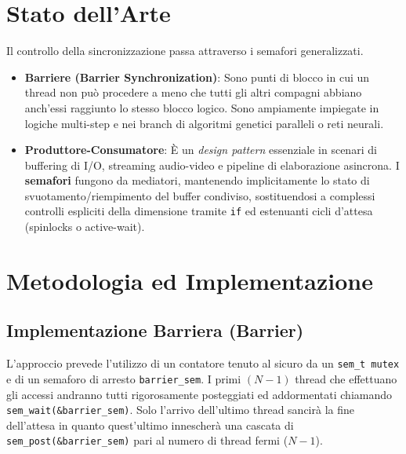 \documentclass[a4paper,12pt]{article}
\begin{document}
\section{Stato dell'Arte}
Il controllo della sincronizzazione passa attraverso i semafori generalizzati.
\begin{itemize}
    \item \textbf{Barriere (Barrier Synchronization)}: Sono punti di blocco in cui un thread non può procedere a meno che tutti gli altri compagni abbiano anch'essi raggiunto lo stesso blocco logico. Sono ampiamente impiegate in logiche multi-step e nei branch di algoritmi genetici paralleli o reti neurali.
    \item \textbf{Produttore-Consumatore}: È un \textit{design pattern} essenziale in scenari di buffering di I/O, streaming audio-video e pipeline di elaborazione asincrona. I \textbf{semafori} fungono da mediatori, mantenendo implicitamente lo stato di svuotamento/riempimento del buffer condiviso, sostituendosi a complessi controlli espliciti della dimensione tramite \texttt{if} ed estenuanti cicli d'attesa (spinlocks o active-wait).
\end{itemize}

\section{Metodologia ed Implementazione}

\subsection{Implementazione Barriera (Barrier)}
L'approccio prevede l'utilizzo di un contatore tenuto al sicuro da un \texttt{sem\_t mutex} e di un semaforo di arresto \texttt{barrier\_sem}.
I primi $(N-1)$ thread che effettuano gli accessi andranno tutti rigorosamente posteggiati ed addormentati chiamando \texttt{sem\_wait(\&barrier\_sem)}.
Solo l'arrivo dell'ultimo thread sancirà la fine dell'attesa in quanto quest'ultimo innescherà una cascata di \texttt{sem\_post(\&barrier\_sem)} pari al numero di thread fermi ($N-1$).
\end{document}
